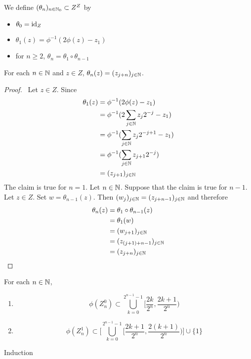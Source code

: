 \documentclass{book}
\begin{document}
	\begin{defn}  
		We define $(\theta_n)_{n \in \mathbb{N}_0} \subset Z^Z$ by
		\begin{itemize}
			\item 	$\theta_0 = \operatorname{id}_Z$
			\item $\theta_1 (z) = \phi^{-1}(2 \phi(z) - z_1)$ 
			\item for $n \geq 2$, $\theta_n = \theta_1 \circ \theta_{n-1}$
		\end{itemize}
	\end{defn}
	
	\begin{ex}  
		For each $n \in \mathbb{N}$ and $z \in Z$, $\theta_n(z) = (z_{j+n})_{j \in \mathbb{N}}$.
	\end{ex}
	
	\begin{proof} \
		Let $z \in Z$. Since  
		\begin{align*}
			\theta_1(z) 
			& = \phi^{-1}(2 \phi(z) - z_1) \\
			& = \phi^{-1}(2 \sum_{j \in \mathbb{N}} z_j2^{-j} - z_1) \\
			& = \phi^{-1}(\sum_{j \in \mathbb{N}} z_j2^{-j+1} - z_1) \\
			& = \phi^{-1}(\sum_{j \in \mathbb{N}} z_{j+1}2^{-j}) \\
			& = (z_{j+1})_{j \in \mathbb{N}}
		\end{align*}
		The claim is true for $n =1$. Let $n \in \mathbb{N}$. Suppose that the claim is true for $n-1$. Let $z \in Z$. Set $w = \theta_{n-1}(z)$. Then $(w_{j})_{j \in \mathbb{N}} = (z_{j+n -1})_{j \in \mathbb{N}}$ and therefore
		\begin{align*}
			\theta_n(z) 
			& = \theta_1 \circ \theta_{n-1} (z) \\
			& = \theta_1 (w) \\
			& = (w_{j + 1})_{j \in \mathbb{N}} \\
			& = (z_{(j+ 1) +  n-1} )_{j \in \mathbb{N}} \\
			& = (z_{j+  n })_{j \in \mathbb{N}}
		\end{align*}
	\end{proof}
	
	
	\begin{ex}  
		For each $n \in \mathbb{N}$, 
		\begin{enumerate}
			\item $$\phi(Z_n^0) \subset \bigcup\limits_{k =0}^{2^{n-1} -1} \bigg[ \frac{2k}{2^n}, \frac{2k+1}{2^n} \bigg)$$
			\item $$\phi(Z_n^1) \subset \bigg[ \bigcup\limits_{k =0}^{2^{n-1} -1} \bigg[ \frac{2k + 1}{2^n}, \frac{2(k+1)}{2^n} \bigg) \bigg] \cup \{1\}$$
		\end{enumerate}
		 Induction
	\end{ex}
	
\end{document}
